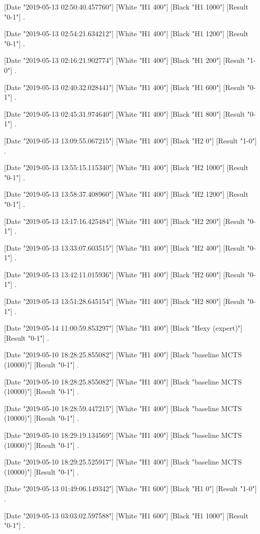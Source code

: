 {[Date "2019-05-13 02:50:40.457760"]
[White "H1 400"]
[Black "H1 1000"]
[Result "0-1"]
.

[Date "2019-05-13 02:54:21.634212"]
[White "H1 400"]
[Black "H1 1200"]
[Result "0-1"]
.

[Date "2019-05-13 02:16:21.902774"]
[White "H1 400"]
[Black "H1 200"]
[Result "1-0"]
.

[Date "2019-05-13 02:40:32.028441"]
[White "H1 400"]
[Black "H1 600"]
[Result "0-1"]
.

[Date "2019-05-13 02:45:31.974640"]
[White "H1 400"]
[Black "H1 800"]
[Result "0-1"]
.

[Date "2019-05-13 13:09:55.067215"]
[White "H1 400"]
[Black "H2 0"]
[Result "1-0"]
.

[Date "2019-05-13 13:55:15.115340"]
[White "H1 400"]
[Black "H2 1000"]
[Result "0-1"]
.

[Date "2019-05-13 13:58:37.408960"]
[White "H1 400"]
[Black "H2 1200"]
[Result "0-1"]
.

[Date "2019-05-13 13:17:16.425484"]
[White "H1 400"]
[Black "H2 200"]
[Result "0-1"]
.

[Date "2019-05-13 13:33:07.603515"]
[White "H1 400"]
[Black "H2 400"]
[Result "0-1"]
.

[Date "2019-05-13 13:42:11.015936"]
[White "H1 400"]
[Black "H2 600"]
[Result "0-1"]
.

[Date "2019-05-13 13:51:28.645154"]
[White "H1 400"]
[Black "H2 800"]
[Result "0-1"]
.

[Date "2019-05-14 11:00:59.853297"]
[White "H1 400"]
[Black "Hexy (expert)"]
[Result "0-1"]
.

[Date "2019-05-10 18:28:25.855082"]
[White "H1 400"]
[Black "baseline MCTS (10000)"]
[Result "0-1"]
.

[Date "2019-05-10 18:28:25.855082"]
[White "H1 400"]
[Black "baseline MCTS (10000)"]
[Result "0-1"]
.

[Date "2019-05-10 18:28:59.447215"]
[White "H1 400"]
[Black "baseline MCTS (10000)"]
[Result "0-1"]
.

[Date "2019-05-10 18:29:19.134569"]
[White "H1 400"]
[Black "baseline MCTS (10000)"]
[Result "0-1"]
.

[Date "2019-05-10 18:29:25.525917"]
[White "H1 400"]
[Black "baseline MCTS (10000)"]
[Result "0-1"]
.

[Date "2019-05-13 01:49:06.149342"]
[White "H1 600"]
[Black "H1 0"]
[Result "1-0"]
.

[Date "2019-05-13 03:03:02.597588"]
[White "H1 600"]
[Black "H1 1000"]
[Result "0-1"]
.

}
